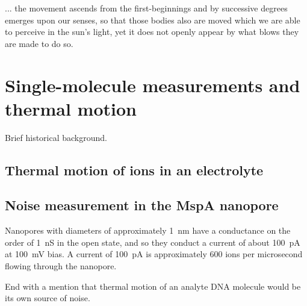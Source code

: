 \begin{savequote}[75mm]
... the movement ascends from the first-beginnings and by successive degrees emerges upon our senses, so that those bodies also are moved which we are able to perceive in the sun's light, yet it does not openly appear by what blows they are made to do so.
\end{savequote}

\chapter{Single-molecule measurements and thermal motion}
\label{thermal_motion}

Brief historical background.

\section{Thermal motion of ions in an electrolyte}

\section{Noise measurement in the MspA nanopore}

Nanopores with diameters of approximately \SI{1}{\nm} have a conductance on the order of \SI{1}{\nano\siemens} in the open state, and so they conduct a current of about \SI{100}{\pA} at \SI{100}{\mV} bias.  A current of \SI{100}{\pA} is approximately \num{600} ions per microsecond flowing through the nanopore.

End with a mention that thermal motion of an analyte DNA molecule would be its own source of noise.